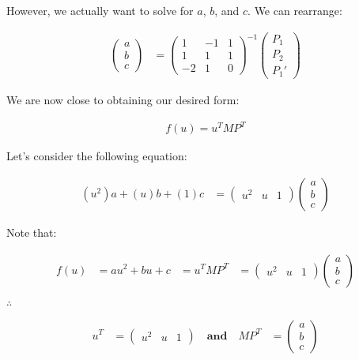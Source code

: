 \documentclass[12pt]{article}
\begin{document}
However, we actually want to solve for $a$, $b$, and $c$.
We can rearrange:

\begin{align}
\begin{pmatrix}
a \\
b \\
c
\end{pmatrix} \nonumber
&=
\begin{pmatrix}
1 & -1 & 1 \\
1 & 1 & 1 \\
-2 & 1 & 0  
\end{pmatrix}^{-1}
\begin{pmatrix}
P_1 \\
P_2 \\
P_1'
\end{pmatrix} \nonumber
\end{align}

We are now close to obtaining our desired form:

\begin{align}
f(u) = u^{T}MP^{T}
\end{align}

Let's consider the following equation:

\begin{align}
(u^2)a + (u)b + (1)c
&=
\begin{pmatrix}
u^2 & u & 1
\end{pmatrix} \nonumber
\begin{pmatrix}
a \\
b \\
c
\end{pmatrix} \nonumber
\end{align}

Note that:

\begin{align}
f(u) 
&=
au^2 + bu + c
&= 
u^{T}MP^{T}
&=
\begin{pmatrix}
u^2 & u & 1
\end{pmatrix} \nonumber
\begin{pmatrix}
a \\
b \\
c
\end{pmatrix} \nonumber
\end{align}

$\therefore$

\begin{align}
u^T
&=
\begin{pmatrix}
u^2 & u & 1
\end{pmatrix} \nonumber
\quad
\textbf{and}
\quad
MP^T
&=
\begin{pmatrix}
a \\
b \\
c
\end{pmatrix} \nonumber
\end{align}
\end{document}
